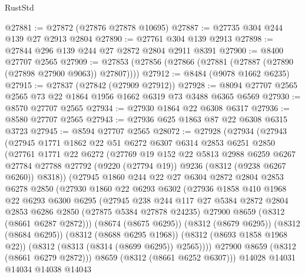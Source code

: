 \begin{lexlean}{RustStd}
\begin{coremodule}
@27881 := @27872 (@27876 @27878 @10695)
@27887 := @27735 @304 @244 @139 @27 @2913 @2804
@27890 := @27761 @304 @139 @2913
@27898 := @27844 @296 @139 @244 @27 @2872 @2804 @2911 @8391
@27900 := @8400 @27707 @2565
@27909 := @27853 (@27856 (@27866 (@27881 (@27887 (@27890 (@27898 @27900 @9063)) @27807))))
@27912 := @8484 (@9078 @1662 @6235)
@27915 := @27837 (@27842 (@27909 @27912))
@27928 := @8094 @27707 @2565 @2565 @73 @22 @1864 @1956 @1662 @6319 @73 @3488 @6365 @6569
@27930 := @8570 @27707 @2565
@27934 := @27930 @1864 @22 @6308 @6317
@27936 := @8580 @27707 @2565
@27943 := @27936 @625 @1863 @87 @22 @6308 @6315 @3723
@27945 := @8594 @27707 @2565
@28072 := @27928
    (@27934
      (@27943
        (@27945
          @1771
          @1862
          @22
          @51
          @6272
          @6307
          @6314
          @2853
          @6251
          @2850
          (@27761
            @1771
            @22
            @6272
            (@27769
              @19
              @152
              @22
              @5813
              @2988
              @6259
              @6267
              @27784
              @27788
              @27792
              (@9220 (@27794 @19))
              @9236
              (@8312 (@9238 @6267 @6260))
              @8318))
          (@27945
            @1860
            @244
            @22
            @27
            @6304
            @2872
            @2804
            @2853
            @6278
            @2850
            (@27930
              @1860
              @22
              @6293
              @6302
              (@27936
                @1858
                @410
                @1968
                @22
                @6293
                @6300
                @6295
                (@27945
                  @238
                  @244
                  @117
                  @27
                  @5384
                  @2872
                  @2804
                  @2853
                  @6286
                  @2850
                  (@27875 @5384 @27878 @24235)
                  @27900
                  @8659
                  (@8312 (@8661 @6287 @2872)))
                (@8674 (@8675 @6295))
                (@8312 (@8679 @6295))
                (@8312 (@8684 @6295))
                (@8312 (@8688 @6295 @1968))
                (@8312 (@8693 @1858 @1968 @22))
                (@8312 (@8313 (@8314 (@8699 @6295)) @2565))))
            @27900
            @8659
            (@8312 (@8661 @6279 @2872)))
          @8659
          (@8312 (@8661 @6252 @6307)))
        @14028
        @14031
        @14034
        @14038
        @14043

\end{coremodule}
\end{lexlean}
